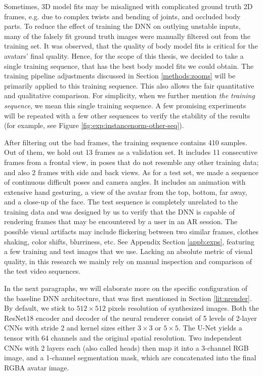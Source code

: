 Sometimes, 3D model fits may be misaligned with complicated ground truth 2D frames, e.g. due to complex twists and bending of joints, and occluded body parts. To reduce the effect of training the DNN on outlying unstable inputs, many of the falsely fit ground truth images were manually filtered out from the training set. It was observed, that the quality of body model fits is critical for the avatars' final quality. Hence, for the scope of this thesis, we decided to take a single training sequence, that has the best body model fits we could obtain. The training pipeline adjustments discussed in Section \ref{methods:zooms} will be primarily applied to this training sequence. This also allows the fair quantitative and qualitative comparison. For simplicity, when we further mention \textit{the training sequence}, we mean this single training sequence. A few promising experiments will be repeated with a few other sequences to verify the stability of the results (for example, see Figure \ref{fig:exp:instancenorm-other-seq}). 

After filtering out the bad frames, the training sequence contains 410 samples. Out of them, we hold out 13 frames as a validation set. It includes 11 consecutive frames from a frontal view, in poses that do not resemble any other training data; and also 2 frames with side and back views. As for a test set, we made a sequence of continuous difficult poses and camera angles. It includes an animation with extensive hand gesturing, a view of the avatar from the top, bottom, far away, and a close-up of the face. The test sequence is completely unrelated to the training data and was designed by us to verify that the DNN is capable of rendering frames that may be encountered by a user in an AR session. The possible visual artifacts may include flickering between two similar frames, clothes shaking, color shifts, blurriness, etc. See Appendix Section \ref{appb:exps}, featuring a few training and test images that we use. Lacking an absolute metric of visual quality, in this research we mainly rely on manual inspection and comparison of the test video sequences. 

In the next paragraphs, we will elaborate more on the specific configuration of the baseline DNN architecture, that was first mentioned in Section \ref{lit:nrender}. By default, we stick to $512\times512$ pixels resolution of synthesized images. Both the ResNet18 encoder and decoder of the neural renderer consist of 5 levels of 2-layer CNNs with stride 2 and kernel sizes either $3\times3$ or $5\times5$. The U-Net yields a tensor with 64 channels and the original spatial resolution. Two independent CNNs with 2 layers each (also called heads) then map it into a 3-channel RGB image, and a 1-channel segmentation mask, which are concatenated into the final RGBA avatar image.

